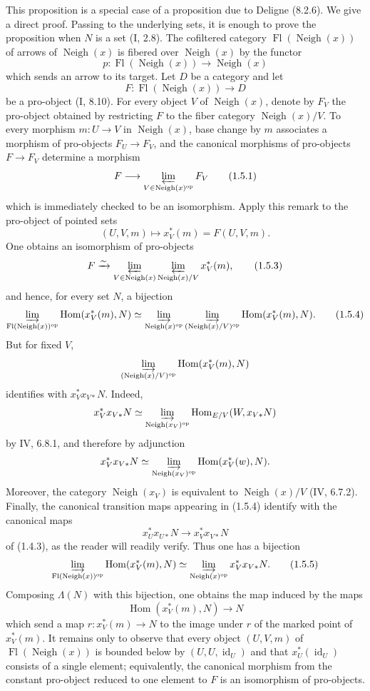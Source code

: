 \documentclass[11pt]{article}
\newcommand{\Hom}{\operatorname{Hom}}
\newcommand{\id}{\operatorname{id}}
\newcommand{\Vois}{\operatorname{Neigh}}
\newcommand{\Fl}{\operatorname{Fl}}
\newcommand{\op}{\mathrm{op}}
\begin{document}
This proposition is a special case of a proposition due to Deligne (8.2.6). We give a direct proof. Passing to the underlying sets, it is enough to prove the proposition when $N$ is a set (I, 2.8). The cofiltered category $\Fl(\Vois(x))$ of arrows of $\Vois(x)$ is fibered over $\Vois(x)$ by the functor
\[
p:\Fl(\Vois(x))\longrightarrow \Vois(x)
\]
which sends an arrow to its target. Let $D$ be a category and let
\[
F:\Fl(\Vois(x))\longrightarrow D
\]
be a pro-object (I, 8.10). For every object $V$ of $\Vois(x)$, denote by $F_V$ the pro-object obtained by restricting $F$ to the fiber category $\Vois(x)/V$. To every morphism $m:U\to V$ in $\Vois(x)$, base change by $m$ associates a morphism of pro-objects $F_U\to F_V$, and the canonical morphisms of pro-objects $F\to F_V$ determine a morphism
\[
F\longrightarrow \varprojlim_{V\in \Vois(x)^\op}F_V
\tag{1.5.1}
\]
which is immediately checked to be an isomorphism. Apply this remark to the pro-object of pointed sets
\[
(U,V,m)\longmapsto x_V^*(m)=F(U,V,m).
\tag{1.5.2}
\]
One obtains an isomorphism of pro-objects
\[
F\xrightarrow{\sim}
\varprojlim_{V\in \Vois(x)}
   \varprojlim_{\Vois(x)/V}x_V^*(m),
\tag{1.5.3}
\]
and hence, for every set $N$, a bijection
\[
\varinjlim_{\Fl(\Vois(x))^\op}\Hom(x_V^*(m),N)
\simeq
\varinjlim_{\Vois(x)^\op}
   \varinjlim_{(\Vois(x)/V)^\op}\Hom(x_V^*(m),N).
\tag{1.5.4}
\]
But for fixed $V$,
\[
\varinjlim_{(\Vois(x)/V)^\op}\Hom(x_V^*(m),N)
\]
identifies with $x_V^*x_{V*}N$. Indeed,
\[
x_V^*x_{V*}N\simeq
\varinjlim_{\Vois(x_V)^\op}\Hom_{E/V}(W,x_{V*}N)
\]
by IV, 6.8.1, and therefore by adjunction
\[
x_V^*x_{V*}N\simeq
\varinjlim_{\Vois(x_V)^\op}\Hom(x_V^*(w),N).
\]
Moreover, the category $\Vois(x_V)$ is equivalent to $\Vois(x)/V$ (IV, 6.7.2). Finally, the canonical transition maps appearing in (1.5.4) identify with the canonical maps
\[
x_U^*x_{U*}N\longrightarrow x_V^*x_{V*}N
\]
of (1.4.3), as the reader will readily verify. Thus one has a bijection
\[
\varinjlim_{\Fl(\Vois(x))^\op}\Hom(x_V^*(m),N)
\simeq
\varinjlim_{\Vois(x)^\op}x_V^*x_{V*}N .
\tag{1.5.5}
\]
Composing $\Lambda(N)$ with this bijection, one obtains the map induced by the maps
\[
\Hom(x_V^*(m),N)\longrightarrow N
\]
which send a map $r:x_V^*(m)\to N$ to the image under $r$ of the marked point of $x_V^*(m)$. It remains only to observe that every object $(U,V,m)$ of $\Fl(\Vois(x))$ is bounded below by $(U,U,\id_U)$ and that $x_U^*(\id_U)$ consists of a single element; equivalently, the canonical morphism from the constant pro-object reduced to one element to $F$ is an isomorphism of pro-objects.
\end{document}
